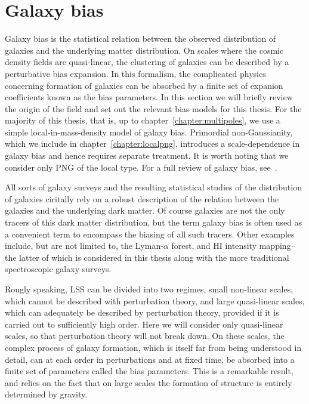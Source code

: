 \section{Galaxy bias}
\label{section:galaxybias}

Galaxy bias is the statistical relation between the observed distribution of galaxies and the underlying matter distribution. On scales where the cosmic density fields are quasi-linear, the clustering of galaxies can be described by a perturbative bias expansion. In this formalism, the complicated physics concerning formation of galaxies can be absorbed by a finite set of expanion coefficients known as the bias parameters. In this section we will briefly review the origin of the field and set out the relevant bias models for this thesis. For the majority of this thesis, that is, up to chapter~\ref{chapter:multipoles}, we use a simple local-in-mass-density model of galaxy bias. Primordial non-Gaussianity, which we include in chapter~\ref{chapter:localpng}, introduces a scale-dependence in galaxy bias and hence requires separate treatment. It is worth noting that we consider only PNG of the local type. For a full review of galaxy bias, see~\cite{Desjacques:2016bnm}.

All sorts of galaxy surveys and the resulting statistical studies of the distribution of galaxies ciritally rely on a robust description of the relation between the galaxies and the underlying dark matter. Of course galaxies are not the only tracers of this dark matter distribution, but the term galaxy bias is often used as a convenient term to encompass the biasing of all such tracers. Other examples include, but are not limited to, the Lyman-$\alpha$ forest, and HI intensity mapping-- the latter of which is considered in this thesis along with the more traditional spectroscopic galaxy surveys. 

Rougly speaking, LSS can be divided into two regimes, small non-linear scales, which cannot be described with perturbation theory, and large quasi-linear scales, which can adequately be described by perturbation theory, provided if it is carried out to sufficiently high order. Here we will consider only quasi-linear scales, so that perturbation theory will not break down. On these scales, the complex process of galaxy formation, which is itself far from being understood in detail, can at each order in perturbations and at fixed time, be absorbed into a finite set of parameters called the bias parameters. This is a remarkable result, and relies on the fact that on large scales the formation of structure is entirely determined by gravity. 

